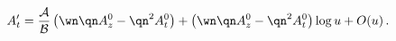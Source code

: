 \begin{equation}
A_t' = { {\cal A}\over {\cal B}} \left( \wn \qn A_z^0 - \qn^2 A_t^0 \right)
+  \left(  \wn \qn A_z^0 - \qn^2 A_t^0 \right) \log{u} + O(u)\,. 
\end{equation}

